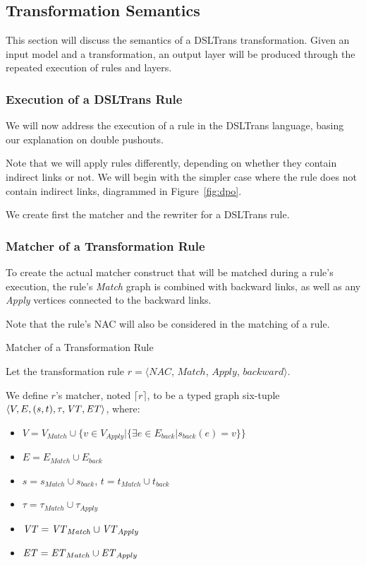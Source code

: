 \subsection{Transformation Semantics}
\label{sec:DSLTrans_semantics}

This section will discuss the semantics of a DSLTrans transformation. Given an input model and a transformation, an output layer will be produced through the repeated execution of rules and layers.



\subsubsection*{Execution of a DSLTrans Rule}

We will now address the execution of a rule in the DSLTrans language, basing our explanation on double pushouts.

Note that we will apply rules differently, depending on whether they contain indirect links or not. We will begin with the simpler case where the rule does not contain indirect links, diagrammed in Figure~\ref{fig:dpo}.

We create first the matcher and the rewriter for a DSLTrans rule.


\subsubsection*{Matcher of a Transformation Rule}

To create the actual matcher construct that will be matched during a rule's execution, the rule's \textit{Match} graph is combined with backward links, as well as any \textit{Apply} vertices connected to the backward links.

Note that the rule's NAC will also be considered in the matching of a rule.

\begin{definition}{Matcher of a Transformation Rule\\}
\label{def:matcher_transformation_rule}

Let the transformation rule $r = \big\langle \mathit{NAC}$, $\mathit{Match}$, $\mathit{Apply}$, $\mathit{backward}\big\rangle$.

We define $r$'s matcher, noted $\lceil r \rceil$, to be a typed graph six-tuple $\langle V,E,(s,t),\tau, \mathit{VT}, \mathit{ET}\rangle$, where:
\begin{itemize}
\item $V = V_{Match} \cup \big\{v \in V_{Apply} | \{\exists e \in E_{back} | s_{back}(e) = v\}\big\}$
\item $E = E_{Match} \cup E_{back}$
\item $s = s_{Match} \cup s_{back}$, $t = t_{Match} \cup t_{back}$
\item $\tau = \tau_{Match} \cup \tau_{Apply}$
\item $\mathit{VT} = \mathit{VT}_{Match} \cup \mathit{VT}_{Apply}$
\item $\mathit{ET} = \mathit{ET}_{Match} \cup \mathit{ET}_{Apply}$
\end{itemize}

\end{definition}

